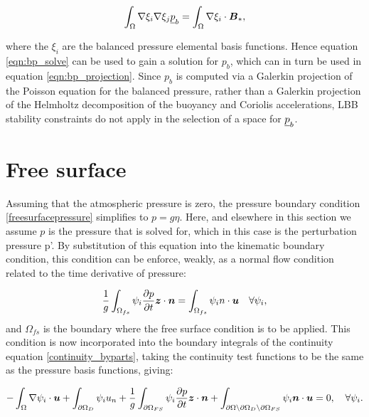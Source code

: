 \begin{equation}\label{eqn:bp_solve}
  \int_\Omega \nabla \xi_i \nabla \xi_j \underline{p}_b = \int_\Omega \nabla \xi_i \cdot {\mbox{\boldmath$B$}}_*,
\end{equation}

where the $\xi_i$ are the balanced pressure elemental basis functions. Hence equation
\eqref{eqn:bp_solve} can be used to gain a solution for $p_b$, which can in turn
be used in equation \eqref{eqn:bp_projection}. Since $p_b$ is computed via
a Galerkin projection of the Poisson equation for the balanced pressure,
rather than a Galerkin projection of the Helmholtz decomposition of the buoyancy
and Coriolis accelerations, LBB stability constraints do not apply in the selection
of a space for $\underline{p}_b$.

\section{Free surface}\label{sec:free_surface}
Assuming that the atmospheric pressure is zero, the pressure boundary condition
\eqref{freesurfacepressure} simplifies to $p=g\eta$. Here, and elsewhere in
this section we assume $p$ is the pressure that is solved for, which in this
case is the perturbation pressure p'. By substitution of this equation into the
kinematic boundary condition, this condition can be enforce, weakly, as a
normal flow condition related to the time derivative of pressure:

\begin{equation}\label{weakfreesurf3}
\frac{1}{g} \int_{\Omega_{fs}} {\psi_i }\frac{\partial p}{\partial t}{\mbox{\boldmath$z$}} \cdot {\mbox{\boldmath$n$}}=\int_{\Omega_{fs}} \psi_i {n \cdot {\mbox{\boldmath$u$}}} \quad
  \forall \psi_i,
\end{equation}
and $\Omega_{fs}$ is the boundary where the free surface condition is to be applied. This condition is now incorporated into the boundary integrals of the continuity equation \eqref{continuity_byparts}, taking the continuity test functions to be the same as the pressure basis functions, giving:

\begin{equation}\label{continuity_byparts_withfs}
  -\int_\Omega \nabla\psi_i \cdot {\mbox{\boldmath$u$}}
  + \int_{\partial\Omega_D} \psi_i u_n
  + \frac{1}{g} \int_{\partial\Omega_{FS}}  {\psi_i }\frac{\partial p}{\partial t}{\mbox{\boldmath$z$}} \cdot {\mbox{\boldmath$n$}}
  + \int_{\partial\Omega\setminus\partial\Omega_D\setminus\partial\Omega_{FS}} \psi_i{\mbox{\boldmath$n$}}\cdot {\mbox{\boldmath$u$}}
  = 0,\quad
  \forall \psi_i.
\end{equation}

